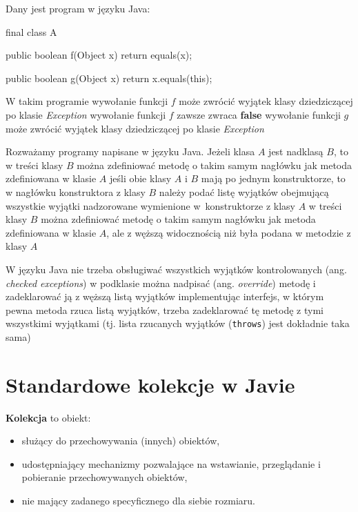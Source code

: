 \begin{problems}
    \prob Dany jest program w języku Java:
    \begin{java}
        final class A {
        
            public boolean f(Object x) {
                return equals(x);
            }
            
            public boolean g(Object x) {
                return x.equals(this);
            }
        }
    \end{java}
    W takim programie
    \answers
    {wywołanie funkcji $f$ może zwrócić wyjątek klasy dziedziczącej po klasie \textit{Exception}}
    {wywołanie funkcji $f$ zawsze zwraca \textbf{false}}
    {wywołanie funkcji $g$ może zwrócić wyjątek klasy dziedziczącej po klasie \textit{Exception}}

    \prob Rozważamy programy napisane w języku Java. Jeżeli klasa $A$ jest nadklasą $B$, to 
    \answers
    {w treści klasy $B$ można zdefiniować metodę o takim samym nagłówku jak metoda zdefiniowana w klasie $A$}
    {jeśli obie klasy $A$ i $B$ mają po jednym konstruktorze, to w nagłówku konstruktora z klasy $B$ należy podać listę wyjątków obejmującą wszystkie wyjątki nadzorowane wymienione w~konstruktorze z klasy $A$}
    {w treści klasy $B$ można zdefiniować metodę o takim samym nagłówku jak metoda zdefiniowana w klasie $A$, ale z węższą widocznością niż była podana w metodzie z klasy $A$}

    \prob W języku Java
    \answers
    {nie trzeba obsługiwać wszystkich wyjątków kontrolowanych (ang. \textit{checked exceptions})}
    {w podklasie można nadpisać (ang. \textit{override}) metodę i zadeklarować ją z węższą listą wyjątków}
    {implementując interfejs, w którym pewna metoda rzuca listą wyjątków, trzeba zadeklarować tę metodę z tymi wszystkimi wyjątkami (tj. lista rzucanych wyjątków (\texttt{throws}) jest dokładnie taka sama)}
\end{problems}

\section{Standardowe kolekcje w Javie}

\textbf{Kolekcja} to obiekt:
\begin{itemize}
    \item służący do przechowywania (innych) obiektów,
    \item udostępniający mechanizmy pozwalające na wstawianie, przeglądanie i pobieranie przechowywanych obiektów,
    \item nie mający zadanego specyficznego dla siebie rozmiaru.
\end{itemize}

